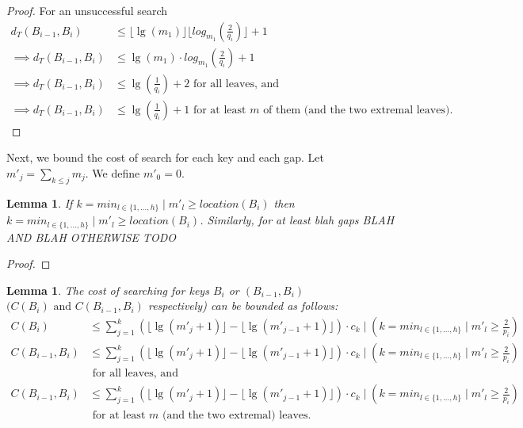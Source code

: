\documentclass[letterpaper,12pt,titlepage,oneside,final]{book}
\theoremstyle{plain}
\newtheorem{lem}[thm]{Lemma}
\begin{document}
\begin{proof}
\noindent For an unsuccessful search
\begin{align*}
d_T(B_{i-1},B_i) &\leq \lfloor \lg(m_1) \rfloor \lfloor log_{m_1}(\frac{2}{q_i}) \rfloor + 1 \\
\implies d_T(B_{i-1},B_i) &\leq \lg(m_1)\cdot log_{m_1}(\frac{2}{q_i}) + 1 \\
\implies d_T(B_{i-1},B_i) &\leq \lg(\frac{1}{q_i}) + 2 \text{ for all leaves, and} \\
\implies d_T(B_{i-1},B_i) &\leq \lg(\frac{1}{q_i}) + 1 \text{ for at least $m$ of them (and the two extremal leaves)}.
\end{align*}


\end{proof}

Next, we bound the cost of search for each key and each gap. Let $m'_j = \sum_{k \leq j} m_j$. We define $m'_0 = 0$.

\begin{lem}

If $k=min_{l \in \{1, ..., h\}} \mid m'_l \geq location(B_i)$ then 
$k=min_{l \in \{1, ..., h\}} \mid m'_l \geq location(B_i)$.
Similarly, for at least blah gaps BLAH 
AND BLAH OTHERWISE TODO


\end{lem}

\begin{proof}

\end{proof}


\begin{lem} \label{AMWPExactLem}
The cost of searching for keys $B_i$ or $(B_{i-1},B_i)$ $(C(B_i) \text{ and } C(B_{i-1},B_i)$ respectively) can be bounded as follows: 
\begin{align*} 
C(B_i) &\leq  \sum_{j=1}^{k} \left(\lfloor \lg(m'_j+1) \rfloor - \lfloor \lg(m'_{j-1}+1) \rfloor \right)\cdot c_k \mid \left( k=min_{l \in \{1, ..., h\}} \mid m'_l \geq \frac{2}{p_i} \right)\\
C(B_{i-1},B_i) &\leq \sum_{j=1}^{k} \left(\lfloor \lg(m'_j+1) \rfloor - \lfloor \lg(m'_{j-1}+1) \rfloor \right)\cdot c_k \mid \left( k=min_{l \in \{1, ..., h\}} \mid m'_l \geq \frac{2}{p_i} \right) \\
& \text{   for all leaves, and} \\
C(B_{i-1},B_i) &\leq \sum_{j=1}^{k} \left(\lfloor \lg(m'_j+1) \rfloor - \lfloor \lg(m'_{j-1}+1) \rfloor \right)\cdot c_k \mid \left( k=min_{l \in \{1, ..., h\}} \mid m'_l \geq \frac{2}{p_i} \right) \\
 & \text{ for at least $m$ (and the two extremal) leaves}.
\end{align*}

\end{lem}
\end{document}
